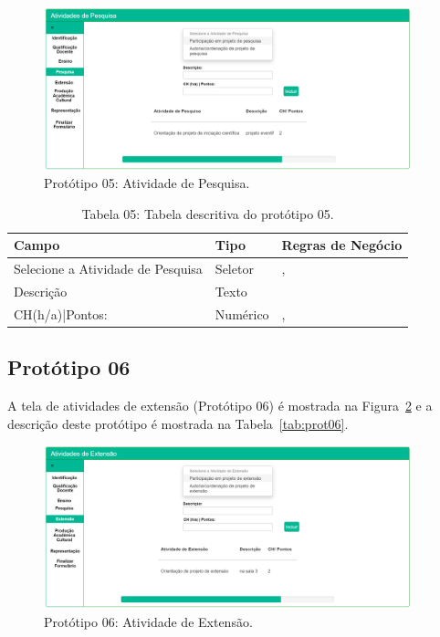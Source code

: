 \begin{figure}[H]
    \centering
    \includegraphics[width=0.95\textwidth]{img/5pagina_pesquisa.png}
    \caption[Protótipo 05: Atividade de Pesquisa]{Protótipo 05: Atividade de Pesquisa.}
    \label{fig:prot05}
\end{figure}


\begin{table}[H]
\centering
\caption[Tabela 05: Tabela descritiva do protótipo 05.]{Tabela 05: Tabela descritiva do protótipo 05.}
\label{tab:prot05}
\begin{tabular}{@{}lll@{}}
\toprule
Campo                             & Tipo     &  Regras de Negócio     \\ \midrule
Selecione a Atividade de Pesquisa & Seletor  &    \nameref{rn008}, \nameref{rn019}\\
Descrição                         & Texto    &    \nameref{rn008}                 \\
CH(h/a)|Pontos:                   & Numérico &    \nameref{rn008}, \nameref{rn020}\\ \bottomrule
\end{tabular}
\end{table}

\newpage
\subsection{Protótipo 06}\label{prototipo06}
A tela de atividades de extensão (Protótipo 06) é mostrada na Figura~\ref{fig:prot06} e a descrição deste protótipo é mostrada na Tabela~\ref{tab:prot06}.


\begin{figure}[H]
    \centering
    \includegraphics[width=0.95\textwidth]{img/6pagina_extensao.png}
    \caption[Protótipo 06: Atividade de Extensão]{Protótipo 06: Atividade de Extensão.}
    \label{fig:prot06}
\end{figure}



